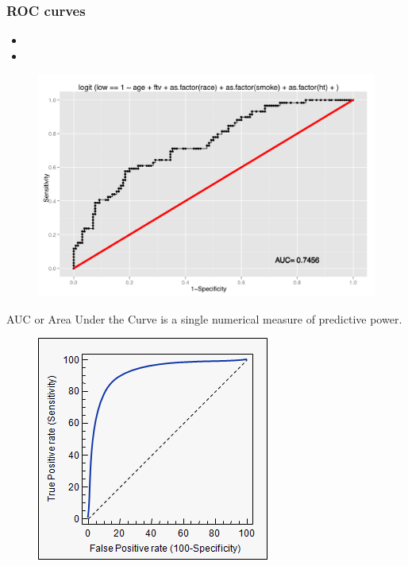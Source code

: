 \documentclass[PredictiveAnalytics101.tex]{subfiles}
\begin{document}
 


\begin{frame}
\frametitle{ROC curves}

\begin{itemize}
\item
\item
\end{itemize}
\end{frame}
\begin{frame}
\begin{figure}
\centering
\includegraphics[width=0.7\linewidth]{LROCPlot}

\end{figure}
\end{frame}
\begin{frame}
	AUC or Area Under the Curve is a single numerical measure of predictive power.
\begin{figure}
\centering
\includegraphics[width=0.7\linewidth]{ROC1}
\end{figure}
	
	
\end{frame}
\end{document}
